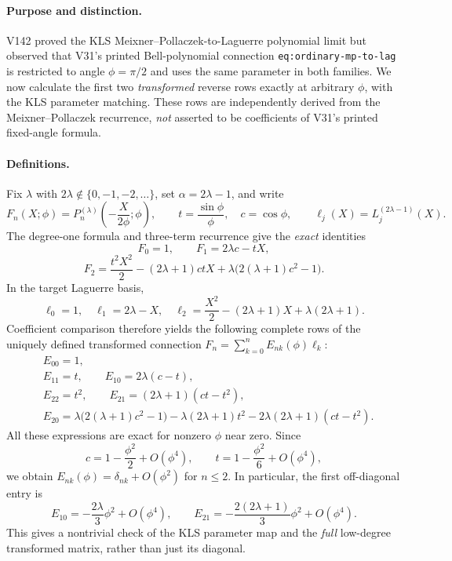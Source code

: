 \documentclass[11pt]{article}
\begin{document}
\paragraph{Purpose and distinction.}
V142 proved the KLS Meixner--Pollaczek-to-Laguerre polynomial limit but observed that V31's printed Bell-polynomial connection \texttt{eq:ordinary-mp-to-lag} is restricted to angle $\phi=\pi/2$ and uses the same parameter in both families. We now calculate the first two \emph{transformed} reverse rows exactly at arbitrary $\phi$, with the KLS parameter matching. These rows are independently derived from the Meixner--Pollaczek recurrence, \emph{not} asserted to be coefficients of V31's printed fixed-angle formula.

\paragraph{Definitions.}
Fix $\lambda$ with $2\lambda\notin\{0,-1,-2,\ldots\}$, set $\alpha=2\lambda-1$, and write
\[
 F_n(X;\phi)=P_n^{(\lambda)}\!\left(-\frac{X}{2\phi};\phi\right),\qquad
 t=\frac{\sin\phi}{\phi},\quad c=\cos\phi,
 \qquad \ell_j(X)=L_j^{(2\lambda-1)}(X).
\]
The degree-one formula and three-term recurrence give the \emph{exact} identities
\[
 F_0=1,\qquad F_1=2\lambda c-tX,
\]
\[
 F_2=\frac{t^2X^2}{2}-(2\lambda+1)ctX
 +\lambda\bigl(2(\lambda+1)c^2-1\bigr).
\]
In the target Laguerre basis,
\[
 \ell_0=1,\quad \ell_1=2\lambda-X,\quad
 \ell_2=\frac{X^2}{2}-(2\lambda+1)X+\lambda(2\lambda+1).
\]
Coefficient comparison therefore yields the following complete rows of the uniquely defined transformed connection $F_n=\sum_{k=0}^n E_{nk}(\phi)\ell_k$:
\begin{align*}
&E_{00}=1,\\
&E_{11}=t,\qquad E_{10}=2\lambda(c-t),\\
&E_{22}=t^2,\qquad E_{21}=(2\lambda+1)(ct-t^2),\\
&E_{20}=\lambda\bigl(2(\lambda+1)c^2-1\bigr)
       -\lambda(2\lambda+1)t^2-2\lambda(2\lambda+1)(ct-t^2).
\end{align*}
All these expressions are exact for nonzero $\phi$ near zero. Since
\[
 c=1-\frac{\phi^2}{2}+O(\phi^4),\qquad
 t=1-\frac{\phi^2}{6}+O(\phi^4),
\]
we obtain $E_{nk}(\phi)=\delta_{nk}+O(\phi^2)$ for $n\le2$. In particular, the first off-diagonal entry is
\[
 E_{10}= -\frac{2\lambda}{3}\phi^2+O(\phi^4),
 \qquad E_{21}=-\frac{2(2\lambda+1)}{3}\phi^2+O(\phi^4).
\]
This gives a nontrivial check of the KLS parameter map and the \emph{full} low-degree transformed matrix, rather than just its diagonal.
\end{document}
